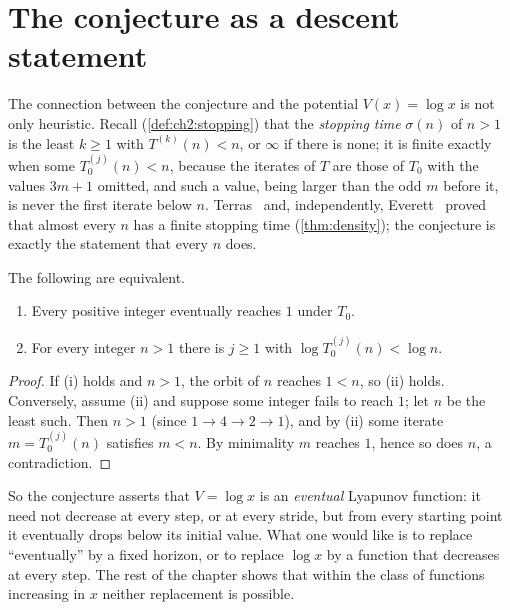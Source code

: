 \section{The conjecture as a descent statement}\label{sec:ch4:descent}

The connection between the conjecture and the potential $V(x)=\log x$ is not
only heuristic.  Recall (\cref{def:ch2:stopping}) that the \emph{stopping time} $\sigma(n)$ of $n>1$ is the least $k\ge1$ with $T^{(k)}(n)<n$, or $\infty$ if there is none; it is finite exactly when some $T_0^{(j)}(n)<n$, because the iterates of $T$ are those of $T_0$ with the values $3m+1$ omitted, and such a value, being larger than the odd $m$ before it, is never the first iterate below $n$.
Terras~\cite{terras1976} and,
independently, Everett~\cite{everett1977} proved that
almost every $n$ has a finite stopping time (\cref{thm:density}); the
conjecture is exactly the statement that every $n$ does.

\begin{proposition}\label{prop:ch4:eventual}
The following are equivalent.
\begin{enumerate}[label=(\roman*)]
\item Every positive integer eventually reaches $1$ under $T_0$.
\item For every integer $n>1$ there is $j\ge1$ with
  $\log T_0^{(j)}(n)<\log n$.
\end{enumerate}
\end{proposition}

\begin{proof}
If (i) holds and $n>1$, the orbit of $n$ reaches $1<n$, so (ii) holds.
Conversely, assume (ii) and suppose some integer fails to reach $1$; let $n$
be the least such.  Then $n>1$ (since $1\to4\to2\to1$), and by (ii) some
iterate $m=T_0^{(j)}(n)$ satisfies $m<n$.  By minimality $m$ reaches $1$,
hence so does $n$, a contradiction.
\end{proof}

So the conjecture asserts that $V=\log x$ is an \emph{eventual} Lyapunov
function: it need not decrease at every step, or at every stride, but from
every starting point it eventually drops below its initial value.  What one
would like is to replace ``eventually'' by a fixed horizon, or to replace
$\log x$ by a function that decreases at every step.  The rest of the chapter
shows that within the class of functions increasing in $x$ neither replacement is
possible.


